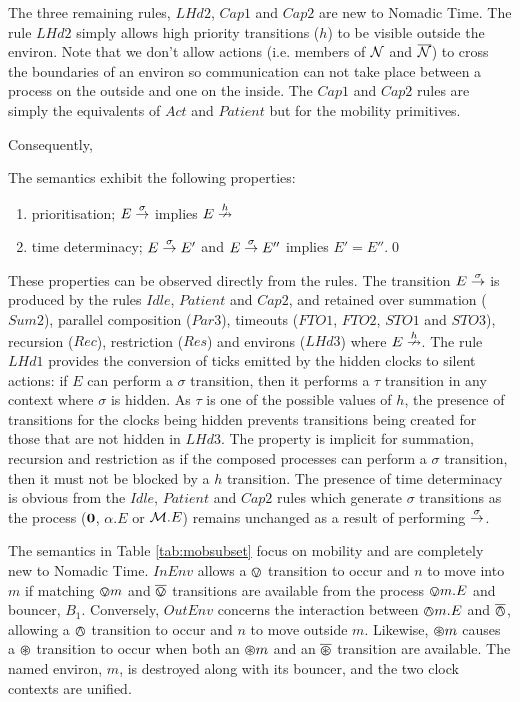 The three remaining rules, $LHd2$, $Cap1$ and $Cap2$ are new to
Nomadic Time.  The rule $LHd2$ simply allows high priority transitions
($h$) to be visible outside the environ.  Note that we don't allow
actions (i.e. members of $\text{$\mathcal{N}$}$ and $\text{$\overline{\text{$\mathcal{N}$}}$}$) to cross the
boundaries of an environ so communication can not take place between a
process on the outside and one on the inside.  The $Cap1$ and $Cap2$
rules are simply the equivalents of $Act$ and $Patient$ but for the
mobility primitives.  

Consequently,

\begin{proposition}
The semantics exhibit the following properties:
\begin{enumerate}
\item prioritisation;
$E \stackrel{\sigma}{\rightarrow}$ implies $E \stackrel{h}{\nrightarrow}$ 
\item time determinacy; $E \stackrel{\sigma}{\rightarrow} E'$ and $E
\stackrel{\sigma}{\rightarrow} E''$ implies $E' = E''$.\qed
\end{enumerate}
\end{proposition}

These properties can be observed directly from the rules.  The
transition $E \stackrel{\sigma}{\rightarrow}$ is produced by the rules $Idle$,
$Patient$ and $Cap2$, and retained over summation ($Sum2$), parallel
composition ($Par3$), timeouts ($FTO1$, $FTO2$, $STO1$ and $STO3$),
recursion ($Rec$), restriction ($Res$) and environs ($LHd3$) where $E
\stackrel{h}{\nrightarrow}$.  The rule $LHd1$ provides the conversion of ticks
emitted by the hidden clocks to silent actions: if $E$ can perform a
$\sigma$ transition, then it performs a $\tau$ transition in any
context where $\sigma$ is hidden.  As $\tau$ is one of the possible
values of $h$, the presence of transitions for the clocks being hidden
prevents transitions being created for those that are not hidden in
$LHd3$.  The property is implicit for summation, recursion and
restriction as if the composed processes can perform a $\sigma$
transition, then it must not be blocked by a $h$ transition.  The
presence of time determinacy is obvious from the $Idle$, $Patient$
and $Cap2$ rules which generate $\sigma$ transitions as the process
($\textbf{0}$, $\alpha.E$ or $\text{$\mathcal{M}$}.E$) remains unchanged as a result of
performing $\stackrel{\sigma}{\rightarrow}$.

The semantics in Table \ref{tab:mobsubset} focus on mobility and are
completely new to Nomadic Time.  $InEnv$ allows a $\varovee$ transition to
occur and $n$ to move into $m$ if matching $\varovee m$ and $\overline{\varovee}$
transitions are available from the process $\varovee m.E$ and bouncer,
$B_1$.  Conversely, $OutEnv$ concerns the interaction between
$\varowedge m.E$ and $\overline{\varowedge}$, allowing a $\varowedge$ transition to occur and
$n$ to move outside $m$.  Likewise, $\varoast m$ causes a $\varoast$
transition to occur when both an $\varoast m$ and an $\overline{\varoast}$
transition are available.  The named environ, $m$, is destroyed along
with its bouncer, and the two clock contexts are unified.

